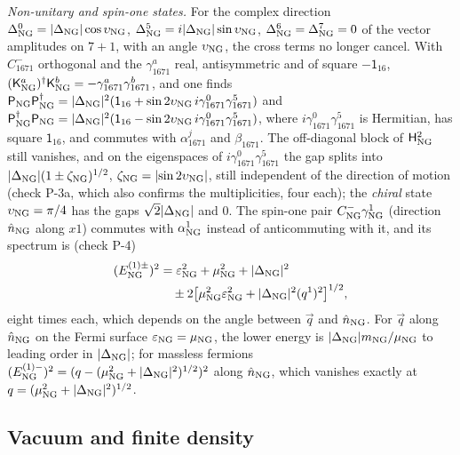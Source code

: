 \emph{Non-unitary and spin-one states.} For the complex direction $\Delta^0_{\rm NG}=\lvert\Delta_{\rm NG}
\rvert\cos\upsilon_{\rm NG}$, $\Delta^5_{\rm NG}=i\lvert\Delta_{\rm NG}\rvert\sin\upsilon_{\rm NG}$,
$\Delta^6_{\rm NG}=\Delta^7_{\rm NG}=0$ of the vector amplitudes on $7+1$, with an angle $\upsilon_{\rm NG}$,
the cross terms no longer cancel. With $C^-_{1671}$ orthogonal and the $\gamma^a_{1671}$ real,
antisymmetric and of square $-\mathsf 1_{16}$, $(\mathsf K^a_{\rm NG})^\dagger\mathsf K^b_{\rm NG}=
-\gamma^a_{1671}\gamma^b_{1671}$, and one finds
$\mathsf P_{\rm NG}\mathsf P^\dagger_{\rm NG}=\lvert\Delta_{\rm NG}\rvert^2(\mathsf 1_{16}+\sin2\upsilon_{\rm NG}\,
i\gamma^0_{1671}\gamma^5_{1671})$ and $\mathsf P^\dagger_{\rm NG}\mathsf P_{\rm NG}=\lvert\Delta_{\rm NG}\rvert^2(\mathsf 1_{16}-
\sin2\upsilon_{\rm NG}\,i\gamma^0_{1671}\gamma^5_{1671})$, where $i\gamma^0_{1671}\gamma^5_{1671}$ is
Hermitian, has square $\mathsf 1_{16}$, and commutes with $\alpha^j_{1671}$ and $\beta_{1671}$. The
off-diagonal block of $\mathsf H_{\rm NG}^2$ still vanishes, and on the eigenspaces of $i\gamma^0_{1671}\gamma^5_{1671}$ the
gap splits into $\lvert\Delta_{\rm NG}\rvert(1\pm\zeta_{\rm NG})^{1/2}$, $\zeta_{\rm NG}=\lvert\sin
2\upsilon_{\rm NG}\rvert$, still independent of the direction of motion (check P-3a, which also confirms
the multiplicities, four each); the \emph{chiral} state $\upsilon_{\rm NG}=\pi/4$ has the gaps
$\sqrt2\lvert\Delta_{\rm NG}\rvert$ and 0. The spin-one pair $C^-_{\rm NG}\gamma^1_{\rm NG}$ (direction
$\hat n_{\rm NG}$ along $x1$) commutes with $\alpha^1_{\rm NG}$ instead of anticommuting with it, and its
spectrum is (check P-4)
\begin{align}
(E^{(1)\pm}_{\rm NG})^2&=\varepsilon_{\rm NG}^2+\mu_{\rm NG}^2+\lvert\Delta_{\rm NG}\rvert^2\nonumber\\
&\quad\pm2\big[\mu_{\rm NG}^2\varepsilon_{\rm NG}^2+\lvert\Delta_{\rm NG}\rvert^2(q^1)^2\big]^{1/2},
\label{eq:spin1}
\end{align}
eight times each, which depends on the angle between $\vec q$ and $\hat n_{\rm NG}$. For $\vec q$ along
$\hat n_{\rm NG}$ on the Fermi surface $\varepsilon_{\rm NG}=\mu_{\rm NG}$, the lower energy is
$\lvert\Delta_{\rm NG}\rvert m_{\rm NG}/\mu_{\rm NG}$ to leading order in $\lvert\Delta_{\rm NG}\rvert$; for
massless fermions $(E^{(1)-}_{\rm NG})^2=(q-(\mu_{\rm NG}^2+\lvert\Delta_{\rm NG}\rvert^2)^{1/2})^2$ along
$\hat n_{\rm NG}$, which vanishes exactly at $q=(\mu_{\rm NG}^2+\lvert\Delta_{\rm NG}\rvert^2)^{1/2}$.

\subsection{Vacuum and finite density}

